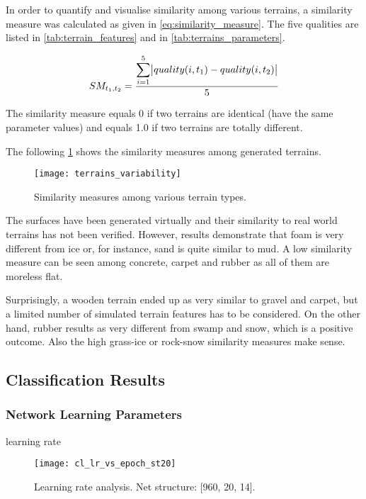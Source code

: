 In order to quantify and visualise similarity among various terrains, a similarity measure was calculated as given in \cref{eq:similarity_measure}. The five qualities are listed in \cref{tab:terrain_features} and in \cref{tab:terrains_parameters}.

\begin{align} \label{eq:similarity_measure}
  SM_{t_1, t_2} = \frac{\displaystyle\sum_{i=1}^{5} \abs{quality(i, t_1) - quality(i, t_2)}}{5}
\end{align} 

The similarity measure equals 0 if two terrains are identical (have the same parameter values) and equals 1.0 if two terrains are totally different.

The following \cref{fig:terrain_similarity_measures} shows the similarity measures among generated terrains.

\begin{figure}[H]
  \centering
  \texttt{[image: terrains\_variability]}
  \caption{Similarity measures among various terrain types.}
  \label{fig:terrain_similarity_measures}
\end{figure}

The surfaces have been generated virtually and their similarity to real world terrains has not been verified. However, results demonstrate that foam is very different from ice or, for instance, sand is quite similar to mud. A low similarity measure can be seen among concrete, carpet and rubber as all of them are moreless flat.

Surprisingly, a wooden terrain ended up as very similar to gravel and carpet, but a limited number of simulated terrain features has to be considered. 
On the other hand, rubber results as very different from swamp and snow, which is a positive outcome. Also the high grass-ice or rock-snow similarity measures make sense. 

\subsection{Classification Results} \label{ssec:classification_results}

\subsubsection{Network Learning Parameters} \label{sssec:analysis_of_learning_parameters}

learning rate

\begin{figure}[H]
  \centering
  \texttt{[image: cl\_lr\_vs\_epoch\_st20]}
  \caption{Learning rate analysis. Net structure: [960, 20, 14].}
  \label{fig:lr_analysis}
\end{figure}

